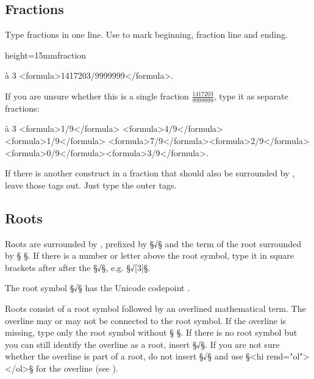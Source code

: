 \tocspace
\subsection{Fractions}
\label{section fractions}

\begin{mainrule}
Type fractions in one line. Use  to mark beginning, fraction line and ending.
\end{mainrule}

\begin{sampleImageSmall}{height=15mm}{fraction}

\begin{typeMath}
à 3 <formula>1417203/9999999</formula>.
\end{typeMath}

If you are unsure whether this is a single fraction $\frac{1417203}{9999999}$, type it as separate fractions:

\begin{typeMath}
à 3 <formula>1/9</formula> <formula>4/9</formula> \lwr<formula>1/9</formula> <formula>7/9</formula>\lwr <formula>2/9</formula> <formula>0/9</formula>\lwr <formula>3/9</formula>.
\end{typeMath}

\end{sampleImageSmall}

\begin{note}
If there is another construct in a fraction that should also be surrounded by , leave those tags out. Just type the outer  tags.
\end{note}


\tocspace
\subsection{Roots}
\label{section roots}

\begin{mainrule}
Roots are surrounded by , prefixed by §√§ and the term of the root surrounded by §{ }§. If there is a number or letter above the root symbol, type it in square brackets after after the §√§, e.g. §√[3]§.
\end{mainrule}

\begin{clarification}
The root symbol §√§ has the Unicode codepoint .
\end{clarification}

\begin{clarification}
Roots consist of a root symbol followed by an overlined mathematical term. The overline may or may not be connected to the root symbol.
If the overline is missing, type only the root symbol without §{ }§.
If there is no root symbol but you can still identify the overline as a root, insert §√§. If you are not sure whether the overline is part of a root, do not insert §√§ and use §<hi rend="ol"> </ol>§ for the overline (see ).
\end{clarification}

